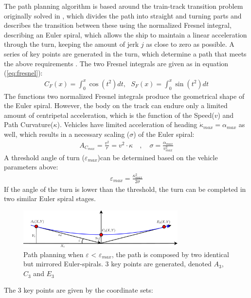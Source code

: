 \documentclass{ifacconf}
\begin{document}
The path planning algorithm is based around the train-track transition problem originally solved in \citep{Art:1}, which divides the path into straight and turning parts and describes the transition between these using the normalized Fresnel integral, describing an Euler spiral, which allows the ship to maintain a linear acceleration through the turn, keeping the amount of jerk $j$ as close to zero as possible. A series of key points are generated in the turn, which determine a path that meets the above requirements \citep{Art:2}. The two Fresnel integrals are given as in equation (\ref{eq:fresnel}):
\begin{align}
C_F(x) = \int_0^x \cos(t^2)dt,\,\,\,\,S_F(x) = \int_0^x \sin(t^2)dt
\label{eq:fresnel}
\end{align}
The functions two normalized Fresnel integrals produce the geometrical shape of the Euler spiral. However, the body on the track can endure only a limited amount of centripetal acceleration, which is the function of the Speed($v$) and Path Curvature($\kappa$). Vehicles have limited acceleration of heading $\dot{\kappa}_{max} = \alpha_{max}$ as well, which results in a necessary scaling ($\sigma$) of the Euler spiral:
\begin{align}
A_{C_{max}} = \frac{v^2}{r} = v^2 \cdot \kappa \quad , \quad \sigma = \frac{\alpha_{max}}{v^2_{max}}
\end{align}
A threshold angle of turn ($\varepsilon_{max}$)can be determined based on the vehicle parameters above:
\begin{align}
\varepsilon_{max} = \frac{\kappa^2_{max}}{2\sigma}
\end{align}
If the angle of the turn is lower than the threshold, the turn can be completed in two similar Euler spiral stages.
\begin{figure}
	\begin{center}
		\includegraphics[width=8.4cm]{img/3Points} %
		\caption{Path planning when $\varepsilon$ < $\varepsilon_{max}$, the path is composed by two identical but mirrored Euler-spirals. 3 key points are generated, denoted $A_3$, $C_3$ and $E_3$}
		\label{fig:3points}
	\end{center}
\end{figure}
The 3 key points are given by the coordinate sets:
\end{document}

